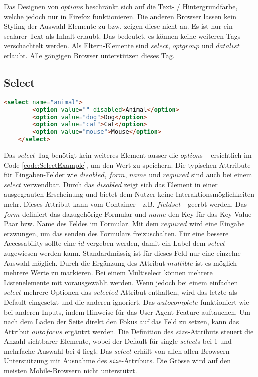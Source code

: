 Das Designen von $option$s beschränkt sich auf die Text- / Hintergrundfarbe, welche jedoch nur in Firefox funktionieren. 
Die anderen Browser lassen kein Styling der Auswahl-Elemente zu bzw. zeigen diese nicht an.
Es ist nur ein scalarer Text als Inhalt erlaubt. 
Das bedeutet, es können keine weiteren Tags verschachtelt werden.
Als Eltern-Elemente sind $select$, $optgroup$ und $datalist$ erlaubt.
Alle gängigen Browser unterstützen dieses Tag.



\subsection{Select}

\begin{lstlisting}[language = html, caption = Code: Select Example, label = code:SelectExample]
    <select name="animal">
        <option value="" disabled>Animal</option>
        <option value="dog">Dog</option>
        <option value="cat">Cat</option>
        <option value="mouse">Mouse</option>
    </select>
\end{lstlisting}

Das $select$-Tag benötigt kein weiteres Element ausser die $option$s – ersichtlich im Code \ref{code:SelectExample}, um den Wert zu speichern.
Die typischen Attrribute für Eingaben-Felder wie $disabled$, $form$, $name$ und $required$ sind auch bei einem $select$ verwendbar.
Durch das $disabled$ zeigt sich das Element in einer ausgegrauten Erscheinung und bietet dem Nutzer keine Interaktionsmöglichkeiten mehr.
Dieses Attribut kann vom Container - z.B. $fieldset$ - geerbt werden.
Das $form$ definiert das dazugehörige Formular und $name$ den Key für das Key-Value Paar bzw. Name des Feldes im Formular. 
Mit dem $required$ wird eine Eingabe erzwungen, um das senden des Formulars freizuschalten.
Für eine bessere Accessability sollte eine $id$ vergeben werden, damit ein Label dem $select$ zugewiesen werden kann.
Standardmässig ist für dieses Feld nur eine einzelne Auswahl möglich.
Durch die Ergänzung des Attribut $multible$ ist es möglich mehrere Werte zu markieren.
Bei einem Multiselect können mehrere Listenelemente mit vorausgewählt werden.
Wenn jedoch bei einem einfachen $select$ mehrere Optionen das $selected$-Attribut enthalten, wird das letzte als Default eingesetzt und die anderen ignoriert.
Das $autocomplete$ funktioniert wie bei anderen Inputs, indem Hinweise für das User Agent Feature auftauchen.
Um nach dem Laden der Seite direkt den Fokus auf das Feld zu setzen, kann das Attribut $autofocus$ ergäntzt werden.
Die Definition des $size$-Attributs steuert die Anzahl sichtbarer Elemente, wobei der Default für single $select$s bei 1 und mehrfache Auswahl bei 4 liegt.
Das $select$ erhält von allen allen Browsern Unterstützung mit Ausnahme des $size$-Attributs.
Die Grösse wird auf den meisten Mobile-Browsern nicht unterstützt.

